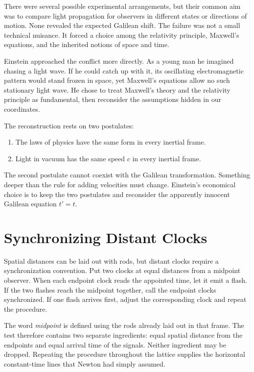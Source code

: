 There were several possible experimental arrangements, but their common aim was to compare light propagation for observers in different states or directions of motion. None revealed the expected Galilean shift. The failure was not a small technical nuisance. It forced a choice among the relativity principle, Maxwell's equations, and the inherited notions of space and time.

Einstein approached the conflict more directly. As a young man he imagined chasing a light wave. If he could catch up with it, its oscillating electromagnetic pattern would stand frozen in space, yet Maxwell's equations allow no such stationary light wave. He chose to treat Maxwell's theory and the relativity principle as fundamental, then reconsider the assumptions hidden in our coordinates.

The reconstruction rests on two postulates:
\begin{enumerate}
\item The laws of physics have the same form in every inertial frame.
\item Light in vacuum has the same speed \(c\) in every inertial frame.
\end{enumerate}

The second postulate cannot coexist with the Galilean transformation. Something deeper than the rule for adding velocities must change. Einstein's economical choice is to keep the two postulates and reconsider the apparently innocent Galilean equation \(t'=t\).

\section{Synchronizing Distant Clocks}

Spatial distances can be laid out with rods, but distant clocks require a synchronization convention. Put two clocks at equal distances from a midpoint observer. When each endpoint clock reads the appointed time, let it emit a flash. If the two flashes reach the midpoint together, call the endpoint clocks synchronized. If one flash arrives first, adjust the corresponding clock and repeat the procedure.

The word \emph{midpoint} is defined using the rods already laid out in that frame. The test therefore contains two separate ingredients: equal spatial distance from the endpoints and equal arrival time of the signals. Neither ingredient may be dropped. Repeating the procedure throughout the lattice supplies the horizontal constant-time lines that Newton had simply assumed.

